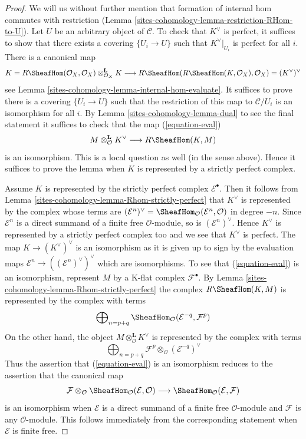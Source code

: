 \begin{proof}
We will us without further mention that formation of internal hom commutes
with restriction (Lemma \ref{sites-cohomology-lemma-restriction-RHom-to-U}). Let $U$
be an arbitrary object of $\mathcal{C}$. To check that
$K^\vee$ is perfect, it suffices to show that there exists a covering
$\{U_i \to U\}$ such that $K^\vee|_{U_i}$ is perfect for all $i$.
There is a canonical map
$$
K = R\SheafHom(\mathcal{O}_X, \mathcal{O}_X)
\otimes_{\mathcal{O}_X}^\mathbf{L} K \longrightarrow
R\SheafHom(R\SheafHom(K, \mathcal{O}_X), \mathcal{O}_X) =
(K^\vee)^\vee
$$
see Lemma \ref{sites-cohomology-lemma-internal-hom-evaluate}. It suffices to prove there
is a covering $\{U_i \to U\}$ such that the restriction of this map
to $\mathcal{C}/U_i$ is an isomorphism for all $i$.
By Lemma \ref{sites-cohomology-lemma-dual} to see the final statement it suffices to check
that the map (\ref{equation-eval})
$$
M \otimes^\mathbf{L}_\mathcal{O} K^\vee
\longrightarrow
R\SheafHom(K, M)
$$
is an isomorphism. This is a local question as well (in the sense above).
Hence it suffices to prove the lemma when $K$ is represented
by a strictly perfect complex.

\medskip\noindent
Assume $K$ is represented by the strictly perfect complex
$\mathcal{E}^\bullet$. Then it follows from
Lemma \ref{sites-cohomology-lemma-Rhom-strictly-perfect}
that $K^\vee$ is represented by the complex whose terms are
$(\mathcal{E}^n)^\vee =
\SheafHom_\mathcal{O}(\mathcal{E}^n, \mathcal{O})$
in degree $-n$. Since $\mathcal{E}^n$ is a direct summand of a finite
free $\mathcal{O}$-module, so is $(\mathcal{E}^n)^\vee$.
Hence $K^\vee$ is represented by a strictly perfect complex too
and we see that $K^\vee$ is perfect.
The map $K \to (K^\vee)^\vee$ is an isomorphism as it is given up
to sign by the evaluation maps
$\mathcal{E}^n \to ((\mathcal{E}^n)^\vee)^\vee$ which are
isomorphisms. To see that (\ref{equation-eval}) is an isomorphism, represent
$M$ by a K-flat complex $\mathcal{F}^\bullet$.
By Lemma \ref{sites-cohomology-lemma-Rhom-strictly-perfect} the complex
$R\SheafHom(K, M)$ is represented by the complex with terms
$$
\bigoplus\nolimits_{n = p + q}
\SheafHom_\mathcal{O}(\mathcal{E}^{-q}, \mathcal{F}^p)
$$
On the other hand, the object $M \otimes^\mathbf{L}_\mathcal{O} K^\vee$
is represented by the complex with terms
$$
\bigoplus\nolimits_{n = p + q}
\mathcal{F}^p \otimes_\mathcal{O} (\mathcal{E}^{-q})^\vee
$$
Thus the assertion that (\ref{equation-eval}) is an isomorphism
reduces to the assertion that the canonical map
$$
\mathcal{F}
\otimes_\mathcal{O}
\SheafHom_\mathcal{O}(\mathcal{E}, \mathcal{O})
\longrightarrow
\SheafHom_\mathcal{O}(\mathcal{E}, \mathcal{F})
$$
is an isomorphism when $\mathcal{E}$ is a direct summand of a finite
free $\mathcal{O}$-module and $\mathcal{F}$ is any $\mathcal{O}$-module.
This follows immediately from the corresponding statement when
$\mathcal{E}$ is finite free.
\end{proof}

